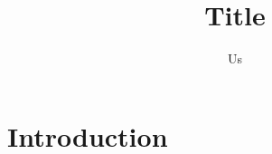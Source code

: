 \documentclass{article}
\title{Title}
\author{Us}
\begin{document}
\maketitle

\section{Introduction}




\end{document}
